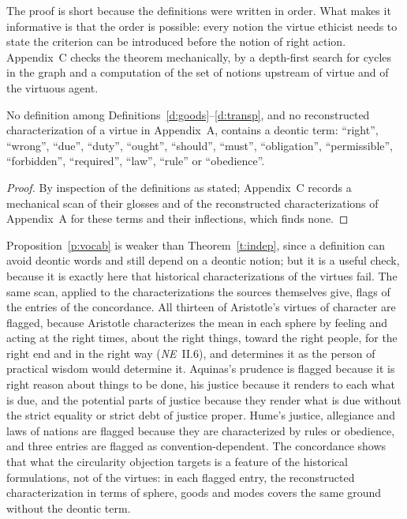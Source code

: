 \documentclass{situationist-preprint}
\begin{document}
The proof is short because the definitions were written in order. What makes it informative is that the order is possible: every notion the virtue ethicist needs to state the criterion can be introduced before the notion of right action. Appendix~C checks the theorem mechanically, by a depth-first search for cycles in the graph and a computation of the set of notions upstream of virtue and of the virtuous agent.

\begin{proposition}[Vocabulary]\label{p:vocab}
No definition among Definitions~\ref{d:goods}--\ref{d:transp}, and no reconstructed characterization of a virtue in Appendix~A, contains a deontic term: \enquote{right}, \enquote{wrong}, \enquote{due}, \enquote{duty}, \enquote{ought}, \enquote{should}, \enquote{must}, \enquote{obligation}, \enquote{permissible}, \enquote{forbidden}, \enquote{required}, \enquote{law}, \enquote{rule} or \enquote{obedience}.
\end{proposition}

\begin{proof}
By inspection of the definitions as stated; Appendix~C records a mechanical scan of their glosses and of the \stnconc{} reconstructed characterizations of Appendix~A for these terms and their inflections, which finds none.
\end{proof}

Proposition~\ref{p:vocab} is weaker than Theorem~\ref{t:indep}, since a definition can avoid deontic words and still depend on a deontic notion; but it is a useful check, because it is exactly here that historical characterizations of the virtues fail. The same scan, applied to the characterizations the sources themselves give, flags \stnconcD{} of the \stnconc{} entries of the concordance. All thirteen of Aristotle's virtues of character are flagged, because Aristotle characterizes the mean in each sphere by feeling and acting at the right times, about the right things, toward the right people, for the right end and in the right way (\emph{NE}~II.6), and determines it as the person of practical wisdom would determine it. Aquinas's prudence is flagged because it is right reason about things to be done, his justice because it renders to each what is due, and the potential parts of justice because they render what is due without the strict equality or strict debt of justice proper. Hume's justice, allegiance and laws of nations are flagged because they are characterized by rules or obedience, and three entries are flagged as convention-dependent. The concordance shows that what the circularity objection targets is a feature of the historical formulations, not of the virtues: in each flagged entry, the reconstructed characterization in terms of sphere, goods and modes covers the same ground without the deontic term.
\end{document}
